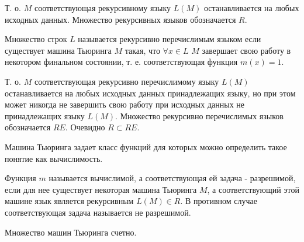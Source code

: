 Т. о. $M$ соответствующая рекурсивному языку $L\left(M\right)$ 
останавливается на любых исходных данных. Множество рекурсивных языков
обозначается $R$.

\begin{definition} 
Множество строк $L$
называется рекурсивно перечислимым языком если существует машина Тьюринга $M$
такая, что $\forall x \in L$ $M$ завершает свою работу в некотором
финальном состоянии, т. е. соответствующая функция $m(x) = 1$. 
\end{definition}

Т. о. $M$ соответствующая рекурсивно перечислимому языку $L\left(M\right)$ 
останавливается на любых исходных данных принадлежащих языку, но при
этом может никогда не завершить свою работу при исходных данных не
принадлежащих языку $L\left(M\right)$. Множество рекурсивно
перечислимых языков обозначается $RE$. Очевидно  $R \subset RE$.

Машина Тьюринга задает класс функций для которых можно определить
такое понятие как вычислимость. 

\begin{definition}
Функция $m$ называется вычислимой, а соответствующая ей задача -
разрешимой, если для нее существует некоторая
машина Тьюринга $M$, а соответствующий этой машине язык является
рекурсивным $L\left(M\right) \in R$. В противном случае соответствующая
задача называется не разрешимой.
\end{definition}

\begin{theorem}
Множество машин Тьюринга счетно.
\label{theoremAddAlgoTuringCountability}
\end{theorem}

